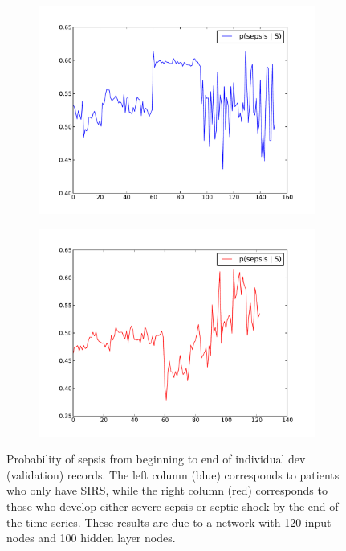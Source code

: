 \documentclass[12pt,solutions]{article}
\begin{document}
\begin{figure}
\begin{subfigure}[b]{0.4\textwidth}
                \includegraphics[width=\textwidth]{nn_plots/probs_c0_4}
                \caption{}
                \label{fig:c0_0}
        \end{subfigure}
        \begin{subfigure}[b]{0.4\textwidth}
                \includegraphics[width=\textwidth]{nn_plots/probs_c1_4}
                \caption{}
                \label{fig:c0_0}
        \end{subfigure}
\caption{Probability of sepsis from beginning to end of individual dev (validation) records. The left column (blue) corresponds to patients who only have SIRS, while the right column (red) corresponds to those who develop either severe sepsis or septic shock by the end of the time series. These results are due to a network with 120 input nodes and 100 hidden layer nodes.}\label{fig:probs}
\end{figure}
\end{document}
